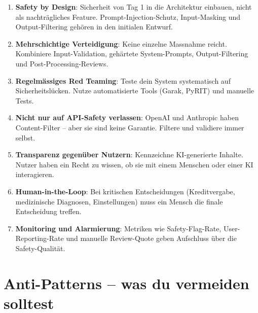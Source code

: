 \begin{enumerate}[leftmargin=*]
    \item \textbf{Safety by Design}: Sicherheit von Tag 1 in die Architektur einbauen, nicht als nachträgliches Feature. Prompt-Injection-Schutz, Input-Masking und Output-Filtering gehören in den initialen Entwurf.
    \item \textbf{Mehrschichtige Verteidigung}: Keine einzelne Massnahme reicht. Kombiniere Input-Validation, gehärtete System-Prompts, Output-Filtering und Post-Processing-Reviews.
    \item \textbf{Regelmässiges Red Teaming}: Teste dein System systematisch auf Sicherheitslücken. Nutze automatisierte Tools (Garak, PyRIT) und manuelle Tests.
    \item \textbf{Nicht nur auf API-Safety verlassen}: OpenAI und Anthropic haben Content-Filter -- aber sie sind keine Garantie. Filtere und validiere immer selbst.
    \item \textbf{Transparenz gegenüber Nutzern}: Kennzeichne KI-generierte Inhalte. Nutzer haben ein Recht zu wissen, ob sie mit einem Menschen oder einer KI interagieren.
    \item \textbf{Human-in-the-Loop}: Bei kritischen Entscheidungen (Kreditvergabe, medizinische Diagnosen, Einstellungen) muss ein Mensch die finale Entscheidung treffen.
    \item \textbf{Monitoring und Alarmierung}: Metriken wie Safety-Flag-Rate, User-Reporting-Rate und manuelle Review-Quote geben Aufschluss über die Safety-Qualität.
\end{enumerate}

\section{Anti-Patterns -- was du vermeiden solltest}

